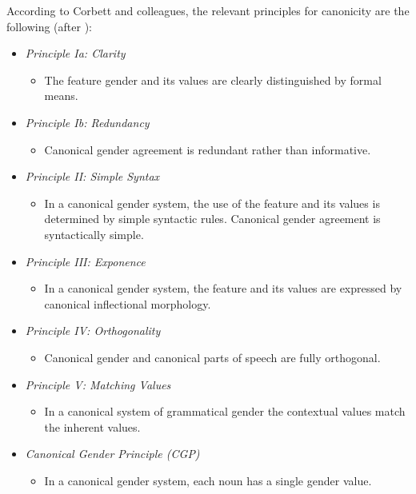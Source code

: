 \documentclass[output=collectionpaper]{langsci/langscibook}
\begin{document}
According to Corbett and colleagues, the relevant principles for canonicity are the following (after \citealt{Corbett2016}):

\begin{itemize}
\item[] \textit{Principle Ia: Clarity}
\begin{itemize}
\item[] The feature gender and its values are clearly distinguished by formal means.
\end{itemize}

\item[]\textit{Principle Ib: Redundancy}
\begin{itemize}
\item[] Canonical gender agreement is redundant rather than informative.
\end{itemize}

\item[]\textit{Principle II: Simple Syntax}

\begin{itemize}
\item[] In a canonical gender system, the use of the feature and its values is determined by simple syntactic rules. Canonical gender agreement is syntactically simple.
\end{itemize}

\item[]\textit{Principle III: Exponence}


\begin{itemize}
\item[] In a canonical gender system, the feature and its values are expressed by canonical inflectional morphology.
\end{itemize}

\item[]\textit{Principle IV: Orthogonality}

\begin{itemize}
\item[] Canonical gender and canonical parts of speech are fully orthogonal.
\end{itemize}

\item[]\textit{Principle V: Matching Values}

\begin{itemize}
\item[] In a canonical system of grammatical gender the contextual values match the inherent values.
\end{itemize}

\item[]\textit{Canonical Gender Principle (CGP)}

\begin{itemize}
\item[] In a canonical gender system, each noun has a single gender value.
\end{itemize}
\end{itemize}
\end{document}
